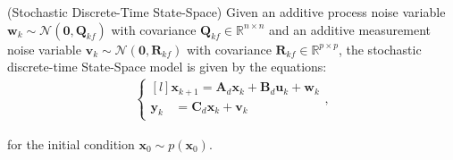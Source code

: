 \documentclass[a4paper,11pt]{book}
\numberwithin{figure}{chapter}
\numberwithin{equation}{chapter}
\numberwithin{table}{chapter}
\theoremstyle{definition}
\newtheorem{definition}{Definition}[chapter]
\newcounter{boxed-theorem}
\newcounter{boxed-lemma}
\newcounter{boxed-definition}
\newenvironment{boxed-definition}[1]
{\colorlet{shadecolor}{pastelYellow!15} \begin{shaded} \begin{definition}{#1}}
{\end{definition} \end{shaded}}
\newcounter{boxed-example}
\begin{document}
\begin{boxed-definition}{(Stochastic Discrete-Time State-Space)} \label{def:stochSS}
    Given an additive process noise variable $\bm{w}_k \sim \mathcal{N}(\bm{0}, \bm{Q}_{kf})$ with covariance $\bm{Q}_{kf} \in \mathbb{R}^{n \times n}$ and an additive measurement noise variable $\bm{v}_k \sim \mathcal{N}(\bm{0}, \bm{R}_{kf})$ with covariance $\bm{R}_{kf} \in \mathbb{R}^{p \times p}$, the stochastic discrete-time State-Space model is given by the equations:
    \begin{align}
    \left\{ \begin{matrix*}[l]
        \bm{x}_{k+1} = \bm{A}_d \bm{x}_k + \bm{B}_d \bm{u}_k + \bm{w}_k \\
        \bm{y}_{k\phantom{+1}} = \bm{C}_d \bm{x}_k + \bm{v}_k 
    \end{matrix*} \right.
    ,\end{align}
    
    \noindent for the initial condition $\bm{x}_0 \sim p(\bm{x}_0)$.
\end{boxed-definition}
\end{document}
